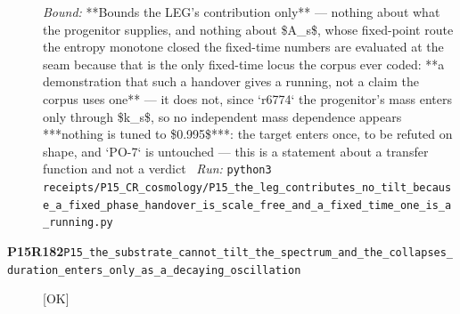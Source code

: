 \begin{description}
 \emph{Bound:}  **Bounds the LEG's contribution only** --- nothing about what the progenitor supplies, and nothing about \$A\_s\$, whose fixed-point route the entropy monotone closed  the fixed-time numbers are evaluated at the seam because that is the only fixed-time locus the corpus ever coded: **a demonstration that such a handover gives a running, not a claim the corpus uses one** --- it does not, since `r6774`  the progenitor's mass enters only through \$k\_s\$, so no independent mass dependence appears  ***nothing is tuned to \$0.995\$***: the target enters once, to be refuted on shape, and `PO-7` is untouched --- this is a statement about a transfer function and not a verdict
\ \emph{Run:} \texttt{python3 receipts/P15\_CR\_cosmology/P15\_the\_leg\_contributes\_no\_tilt\_because\_a\_fixed\_phase\_handover\_is\_scale\_free\_and\_a\_fixed\_time\_one\_is\_a\_running.py}
\item[\rcptlabel{P15_the_substrate_cannot_tilt_the_spectrum_and_the_collapses_duration_enters_only_as_a_decaying_oscillation}{P15R182}\textbf{P15R182}\quad\texttt{P15\_the\_substrate\_cannot\_tilt\_the\_spectrum\_and\_the\_collapses\_duration\_enters\_only\_as\_a\_decaying\_oscillation}]\hfill\textsf{[OK]}\\

\end{description}
